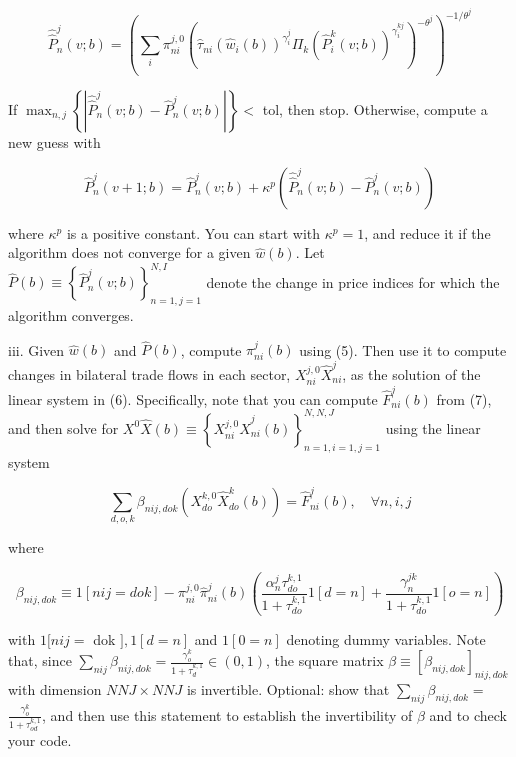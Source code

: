 \documentclass[12pt,oneside,reqno]{article}
\begin{document}
\begin{enumerate}[label=\roman*., leftmargin=*]
\begin{equation*}
\hat{\hat{P}}_{n}^{j}(v ; b)=\left(\sum_{i} \pi_{n i}^{j, 0}\left(\hat{\tau}_{n i}\left(\hat{w}_{i}(b)\right)^{\gamma_{i}^{j}} \Pi_{k}\left(\hat{P}_{i}^{k}(v ; b)\right)^{\gamma_{i}^{k j}}\right)^{-\theta^{j}}\right)^{-1 / \theta^{j}}
\end{equation*}

If $\max _{n, j}\left\{\left|\hat{\hat{P}}_{n}^{j}(v ; b)-\hat{P}_{n}^{j}(v ; b)\right|\right\}<$ tol, then stop. Otherwise, compute a new guess with

\begin{equation*}
\hat{P}_{n}^{j}(v+1 ; b)=\hat{P}_{n}^{j}(v ; b)+\kappa^{p}\left(\hat{\hat{P}}_{n}^{j}(v ; b)-\hat{P}_{n}^{j}(v ; b)\right)
\end{equation*}

where $\kappa^{p}$ is a positive constant. You can start with $\kappa^{p}=1$, and reduce it if the algorithm does not converge for a given $\hat{w}(b)$. Let $\hat{P}(b) \equiv\left\{\hat{P}_{n}^{j}(v ; b)\right\}_{n=1, j=1}^{N, I}$ denote the change in price indices for which the algorithm converges.

iii. Given $\hat{w}(b)$ and $\hat{P}(b)$, compute $\hat{\pi}_{n i}^{j}(b)$ using (5). Then use it to compute changes in bilateral trade flows in each sector, $X_{n i}^{j, 0} \hat{X}_{n i}^{j}$, as the solution of the linear system in (6). Specifically, note that you can compute $\hat{F}_{n i}^{j}(b)$ from (7), and then solve for $X^{0} \hat{X}(b) \equiv\left\{X_{n i}^{j, 0} \hat{X}_{n i}^{j}(b)\right\}_{n=1, i=1, j=1}^{N, N, J}$ using the linear system

\begin{equation*}
\sum_{d, o, k} \beta_{n i j, d o k}\left(X_{d o}^{k, 0} \hat{X}_{d o}^{k}(b)\right)=\hat{F}_{n i}^{j}(b), \quad \forall n, i, j
\end{equation*}

where

\begin{equation*}
\beta_{n i j, d o k} \equiv 1[n i j=d o k]-\pi_{n i}^{j, 0} \hat{\pi}_{n i}^{j}(b)\left(\frac{\alpha_{n}^{j} \tau_{d o}^{k, 1}}{1+\tau_{d o}^{k, 1}} 1[d=n]+\frac{\gamma_{n}^{j k}}{1+\tau_{d o}^{k, 1}} 1[o=n]\right)
\end{equation*}

with $1[n i j=$ dok $], 1[d=n]$ and $1[0=n]$ denoting dummy variables. Note that, since $\sum_{n i j} \beta_{n i j, d o k}=\frac{\gamma_{o}^{k}}{1+\tau_{d}^{k, 1}} \in(0,1)$, the square matrix $\beta \equiv\left[\beta_{n i j, d o k}\right]_{n i j, d o k}$ with dimension $N N J \times N N J$ is invertible. Optional: show that $\sum_{n i j} \beta_{n i j, d o k}=$ $\frac{\gamma_{o}^{k}}{1+\tau_{o d}^{k, 1}}$, and then use this statement to establish the invertibility of $\beta$ and to check your code.


\end{enumerate}
\end{document}
